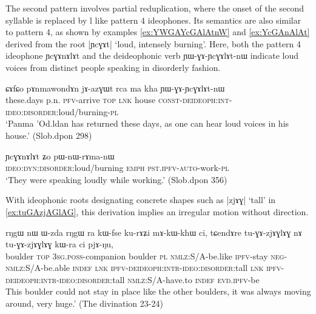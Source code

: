 \documentclass[oldfontcommands,oneside,a4paper,11pt]{article}
\newcommand{\ipa}[1]{{\phon \mbox{#1}}} %
\begin{document}
The second pattern involves partial reduplication, where the onset of the second syllable is replaced by \ipa{l} like pattern 4 ideophones. Its semantics are also similar to pattern 4, as shown by examples  \ref{ex:YWGAYcGAlAtnW} and \ref{ex:YcGAnAlAt} derived from the root |\ipa{ɲcɣɤt}| `loud, intensely burning'. Here, both the  pattern 4 ideophone \ipa{ɲcɣɤnɤlɤt}  and the deideophonic verb  \ipa{ɲɯ-ɣɤ-ɲcɣɤlɤt-nɯ} indicate loud voices from distinct people speaking in disorderly fashion.

     \begin{exe}
\ex \label{ex:YWGAYcGAlAtnW}
\gll 
\ipa{ɕɤfɕo}  	\ipa{pɤnmawondɤn}  	\ipa{jɤ-azɣɯt}  	\ipa{rca}  	\ipa{ma}  	\ipa{kha}  	\ipa{ɲɯ-ɣɤ-ɲcɣɤlɤt-nɯ}  \\
these.days p.n. \textsc{pfv}-arrive \textsc{top} \textsc{lnk} house \textsc{const-deideoph:int-ideo:disorder:}loud/burning-\textsc{pl}\\
\glt `Panma 'Od.ldan has returned these days, as one can hear loud voices in his house.' (Slob.dpon 298)
\end{exe}

     \begin{exe}
\ex \label{ex:YcGAnAlAt}
\gll 
\ipa{ɲcɣɤnɤlɤt}  	\ipa{ʑo}  	\ipa{pɯ-nɯ-rɤma-nɯ}  \\
\textsc{ideo:dyn:disorder}:loud/burning \textsc{emph} \textsc{pst.ipfv-auto}-work-\textsc{pl} \\
\glt `They were speaking loudly while working.' (Slob.dpon 356)
\end{exe}

With ideophonic roots designating concrete shapes such as  |\ipa{zjɤɣ}| `tall' in \ref{ex:tuGAzjAGlAG}, this derivation  implies an irregular motion   without direction.  

     \begin{exe}
\ex \label{ex:tuGAzjAGlAG}
\gll 
\ipa{rŋgɯ}  	\ipa{nɯ}  	\ipa{ɯ-zda}  	\ipa{rŋgɯ}  	\ipa{ra}  	\ipa{kɯ-fse}  	\ipa{ku-rɤʑi}  	\ipa{mɤ-kɯ-khɯ}  	\ipa{ci,}  	\ipa{tɕendɤre}  	\ipa{tu-ɣɤ-zjɤɣlɤɣ}  	\ipa{nɤ}  	\ipa{tu-ɣɤ-zjɤɣlɤɣ}  	\ipa{kɯ-ra}  	\ipa{ci}  	\ipa{pjɤ-ŋu,}  	 \\
boulder \textsc{top} \textsc{3sg.poss}-companion boulder \textsc{pl} \textsc{nmlz}:S/A-be.like \textsc{ipfv}-stay \textsc{neg-nmlz}:S/A-be.able \textsc{indef} \textsc{lnk} \textsc{ipfv-deideoph:intr-ideo:disorder}:tall \textsc{lnk} \textsc{ipfv-deideoph:intr-ideo:disorder}:tall \textsc{nmlz}:S/A-have.to \textsc{indef} \textsc{evd.ipfv}-be \\
\glt  This boulder could not stay in place like the other boulders, it was always moving around, very huge.' (The divination 23-24)
\end{exe}
\end{document}
